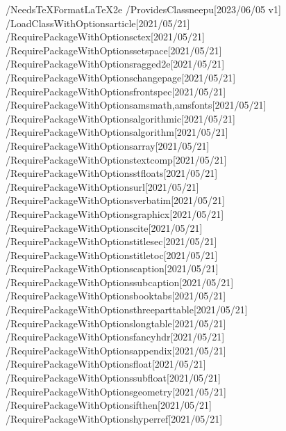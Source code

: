/NeedsTeXFormat{LaTeX2e}
/ProvidesClass{neepu}[2023/06/05 v1]
/LoadClassWithOptions{article}[2021/05/21]
/RequirePackageWithOptions{ctex}[2021/05/21]
/RequirePackageWithOptions{setspace}[2021/05/21]
/RequirePackageWithOptions{ragged2e}[2021/05/21]
/RequirePackageWithOptions{changepage}[2021/05/21]
/RequirePackageWithOptions{frontspec}[2021/05/21]
/RequirePackageWithOptions{amsmath,amsfonts}[2021/05/21]
/RequirePackageWithOptions{algorithmic}[2021/05/21]
/RequirePackageWithOptions{algorithm}[2021/05/21]
/RequirePackageWithOptions{array}[2021/05/21]
/RequirePackageWithOptions{textcomp}[2021/05/21]
/RequirePackageWithOptions{stfloats}[2021/05/21]
/RequirePackageWithOptions{url}[2021/05/21]
/RequirePackageWithOptions{verbatim}[2021/05/21]
/RequirePackageWithOptions{graphicx}[2021/05/21]
/RequirePackageWithOptions{cite}[2021/05/21]
/RequirePackageWithOptions{titlesec}[2021/05/21]
/RequirePackageWithOptions{titletoc}[2021/05/21]
/RequirePackageWithOptions{caption}[2021/05/21]
/RequirePackageWithOptions{subcaption}[2021/05/21]
/RequirePackageWithOptions{booktabs}[2021/05/21]
/RequirePackageWithOptions{threeparttable}[2021/05/21]
/RequirePackageWithOptions{longtable}[2021/05/21]
/RequirePackageWithOptions{fancyhdr}[2021/05/21]
/RequirePackageWithOptions{appendix}[2021/05/21]
/RequirePackageWithOptions{float}[2021/05/21]
/RequirePackageWithOptions{subfloat}[2021/05/21]
/RequirePackageWithOptions{geometry}[2021/05/21]
/RequirePackageWithOptions{ifthen}[2021/05/21]
/RequirePackageWithOptions{hyperref}[2021/05/21]
















